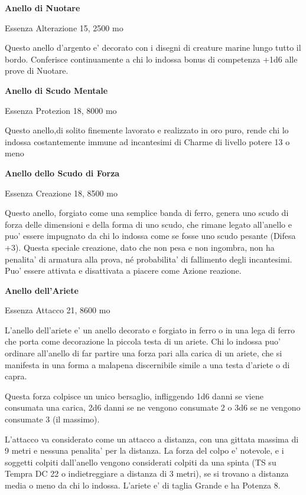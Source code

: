 \documentclass[a4paper,11pt,twoside,openany]{book}
\begin{document}
{		\textbf{Anello di Nuotare}
		
		Essenza Alterazione 15, 2500 mo
		
		Questo anello d'argento e' decorato con i disegni di creature marine lungo tutto il bordo. Conferisce continuamente a chi lo indossa bonus di competenza +1d6 alle prove di Nuotare.
		
		\textbf{Anello di Scudo Mentale}
		
		Essenza Protezion 18, 8000 mo
		
		Questo anello,di solito finemente lavorato e realizzato in oro puro, rende chi lo indossa costantemente immune ad incantesimi di Charme di livello potere 13 o meno
		
		\textbf{Anello dello Scudo di Forza}
		
		Essenza Creazione 18, 8500 mo
		
		Questo anello, forgiato come una semplice banda di ferro, genera uno scudo di forza delle dimensioni e della forma di uno scudo, che rimane legato all'anello e puo' essere impugnato da chi lo indossa come se fosse uno scudo pesante (Difesa +3). Questa speciale creazione, dato che non pesa e non ingombra, non ha penalita' di armatura alla prova, né probabilita' di fallimento degli incantesimi. Puo' essere attivata e disattivata a piacere come Azione reazione.
		
		\textbf{Anello dell'Ariete}
		
		Essenza Attacco 21, 8600 mo
		
		L'anello dell'ariete e' un anello decorato e forgiato in ferro o in una lega di ferro che porta come decorazione la piccola testa di un ariete. Chi lo indossa puo' ordinare all'anello di far partire una forza pari alla carica di un ariete, che si manifesta in una forma a malapena discernibile simile a una testa d'ariete o di capra.
		
		Questa forza colpisce un unico bersaglio, infliggendo 1d6 danni se viene consumata una carica, 2d6 danni se ne vengono consumate 2 o 3d6 se ne vengono consumate 3 (il massimo).
		
		L'attacco va considerato come un attacco a distanza, con una gittata massima di 9 metri e nessuna penalita' per la distanza. La forza del colpo e' notevole, e i soggetti colpiti dall'anello vengono considerati colpiti da una spinta (TS su Tempra DC 22 o indietreggiare a distanza di 3 metri), se si trovano a distanza media o meno da chi lo indossa. L'ariete e' di taglia Grande e ha Potenza 8.
		
}
\end{document}
